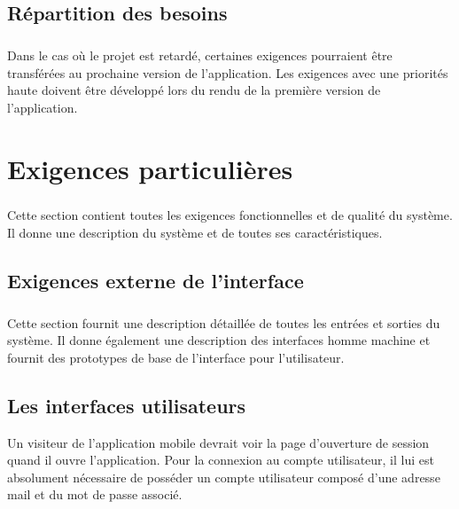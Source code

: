 \documentclass[titlepage, 12pt]{report}
\begin{document}
\section{Répartition des besoins}

\paragraph{}Dans le cas où le projet est retardé, certaines exigences pourraient être transférées au prochaine version de l'application. Les exigences avec une priorités haute doivent être développé lors du rendu de la première version de l'application.

\chapter{Exigences particulières}

\paragraph{}Cette section contient toutes les exigences fonctionnelles et de qualité du système. Il donne une description du système et de toutes ses caractéristiques.

\section{Exigences externe de l'interface}

\paragraph{}Cette section fournit une description détaillée de toutes les entrées et sorties du système. Il donne également une description des interfaces homme machine et fournit des prototypes de base de l'interface pour l'utilisateur.

\section{Les interfaces utilisateurs}

Un visiteur de l'application mobile devrait voir la page d'ouverture de session quand il ouvre l'application. Pour la connexion au compte utilisateur, il lui est absolument nécessaire de posséder un compte utilisateur composé d'une adresse mail et du mot de passe associé.
\end{document}
